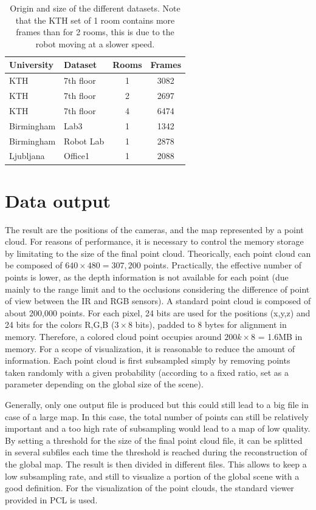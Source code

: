 \begin{table}[H]
 \begin{center}
  \begin{tabular}{llcc}
  \hline
  University & Dataset & Rooms & Frames \\
  \hline
  KTH & 7th floor & 1 & 3082 \\
  KTH & 7th floor & 2 & 2697 \\
  KTH & 7th floor & 4 & 6474 \\
  Birmingham & Lab3 & 1 & 1342 \\
  Birmingham & Robot Lab & 1 & 2878 \\
  Ljubljana & Office1 & 1 & 2088 \\
  \hline
  \end{tabular}
 \end{center}
 \caption{Origin and size of the different datasets. Note that the KTH set of 1 room contains more frames than for 2 rooms, this is due to the robot moving at a slower speed.}
\end{table}

\clearpage

\section{Data output}

The result are the positions of the cameras, and the map represented by a point cloud. For reasons of performance, it is necessary to control the memory storage by limitating to the size of the final point cloud. Theorically, each point cloud can be composed of $640\times480 = 307,200$ points. Practically, the effective number of points is lower, as the depth information is not available for each point (due mainly to the range limit and to the occlusions considering the difference of point of view between the IR and RGB sensors). A standard point cloud is composed of about 200,000 points. For each pixel, 24 bits are used for the positions (x,y,z) and 24 bits for the colors R,G,B ($3\times8$ bits), padded to 8 bytes for alignment in memory. Therefore, a colored cloud point occupies around $200k\times8$ = 1.6MB in memory. For a scope of visualization, it is reasonable to reduce the amount of information. Each point cloud is first subsampled simply by removing points taken randomly with a given probability (according to a fixed ratio, set as a parameter depending on the global size of the scene).

Generally, only one output file is produced but this could still lead to a big file in case of a large map. In this case, the total number of points can still be relatively important and a too high rate of subsampling would lead to a map of low quality. By setting a threshold for the size of the final point cloud file, it can be splitted in several subfiles each time the threshold is reached during the reconstruction of the global map. The result is then divided in different files. This allows to keep a low subsampling rate, and still to visualize a portion of the global scene with a good definition. For the visualization of the point clouds, the standard viewer provided in \gls{PCL} is used.

